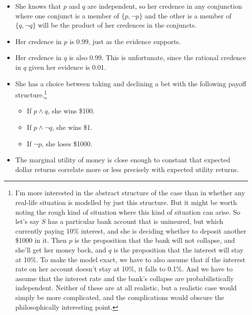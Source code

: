 \begin{itemize}
\item She knows that \(p\) and \(q\) are independent, so her credence in any conjunction where one conjunct is a member of  \(\{p,  \neg p\}\) and the other is a member of \(\{q, \neg q\}\) will be the product of her credences in the conjuncts.
\item Her credence in \(p\) is 0.99, just as the evidence supports.
\item Her credence in \(q\) is also 0.99. This is unfortunate, since the rational credence in \(q\) given her evidence is 0.01.
\item She has a choice between taking and declining a bet with the following payoff structure.\footnote{I'm more interested in the abstract structure of the case than in whether any real-life situation is modelled by just this structure. But it might be worth noting the rough kind of situation where this kind of situation can arise. So let's say \(S\) has a particular bank account that is uninsured, but which currently paying 10\% interest, and she is deciding whether to deposit another \$1000 in it. Then \(p\) is the proposition that the bank will not collapse, and she'll get her money back, and \(q\) is the proposition that the interest will stay at 10\%. To make the model exact, we have to also assume that if the interest rate on her account doesn't stay at 10\%, it falls to 0.1\%. And we have to assume that the interest rate and the bank's collapse are probabilistically independent. Neither of these are at all realistic, but a realistic case would simply be more complicated, and the complications would obscure the philosophically interesting point.}
\begin{itemize}
\item If \(p \wedge q\), she wins \$100.
\item If \(p \wedge \neg q\), she wins \$1.
\item If \(\neg p\), she loses \$1000.
\end{itemize}
\item The marginal utility of money is close enough to constant that expected dollar returns correlate more or less precisely with expected utility returns.
\end{itemize}

